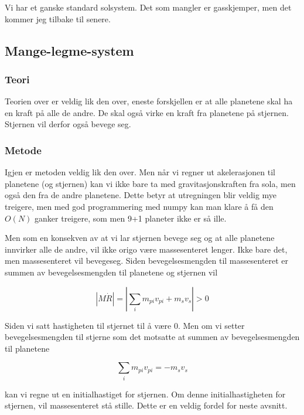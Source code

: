 \documentclass[a4paper,norsk,11pt,twoside]{article}
\begin{document}
Vi har et ganske standard solsystem. Det som mangler er gasskjemper, men det kommer jeg tilbake til senere.

\subsection{Mange-legme-system}

\subsubsection{Teori}

Teorien over er veldig lik den over, eneste forskjellen er at alle planetene skal ha en kraft på alle de andre. De skal også virke en kraft fra planetene på stjernen. Stjernen vil derfor også bevege seg.

\subsubsection{Metode}

Igjen er metoden veldig lik den over. Men når vi regner ut akelerasjonen til planetene (og stjernen) kan vi ikke bare ta med gravitasjonskraften fra sola, men også den fra de andre planetene. Dette betyr at utregningen blir veldig mye treigere, men med god programmering med numpy kan man klare å få den $O(N)$ ganker treigere, som men 9+1 planeter ikke er så ille.

Men som en konsekven av at vi lar stjernen bevege seg og at alle planetene innvirker alle de andre, vil ikke origo være massesenteret lenger. Ikke bare det, men massesenteret vil bevegeseg. Siden bevegelsesmengden til massesenteret er summen av bevegelsesmengden til planetene og stjernen vil

\begin{equation}
|M\dot{R}| = |\sum\limits_i m_{pi}v_{pi} + m_sv_s| > 0 
\end{equation}

Siden vi satt hastigheten til stjernet til å være $0$. Men om vi setter bevegelsesmengden til stjerne som det motsatte at summen av bevegelsesmengden til planetene

\begin{equation}
\sum\limits_i m_{pi}v_{pi} = -m_sv_s
\end{equation}

kan vi regne ut en initialhastiget for stjernen. Om denne initialhastigheten for stjernen, vil massesenteret stå stille. Dette er en veldig fordel for neste avsnitt.
\end{document}
